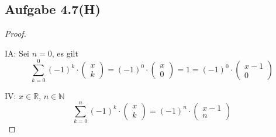 \subsection{Aufgabe 4.7(H)}
\begin{proof}
$ $\newline

IA: Sei $n=0$, es gilt
\begin{equation*}
\sum_{k=0}^{0}(-1)^k\cdot
\begin{pmatrix}
x \\
k
\end{pmatrix}
=
(-1)^0\cdot
\begin{pmatrix}
x \\
0
\end{pmatrix}
=
1
=
(-1)^0\cdot
\begin{pmatrix}
x-1 \\
0
\end{pmatrix}
\end{equation*}

IV: $x\in\mathbb{R}$, $n\in\mathbb{N}$
\begin{equation*}
\sum_{k=0}^{n}(-1)^k\cdot
\begin{pmatrix}
x \\
k
\end{pmatrix}
=
(-1)^n\cdot
\begin{pmatrix}
x-1 \\
n
\end{pmatrix}
\end{equation*}


\end{proof}
